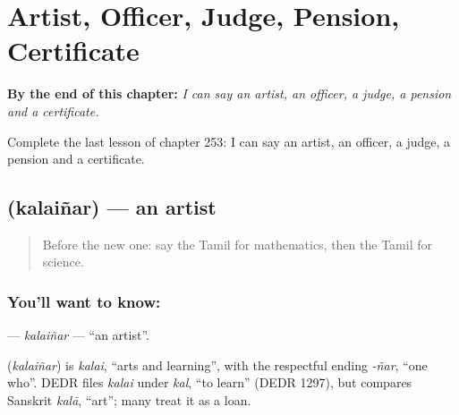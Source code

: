 
\chapter{Artist, Officer, Judge, Pension, Certificate}
\label{ch:ta-artist-officer-judge-pension-certificate}

\begin{chapteropening}
\textbf{By the end of this chapter:} \emph{I can say an artist, an officer, a judge, a pension and a certificate.}

Complete the last lesson of chapter 253: I can say an artist, an officer, a judge, a pension and a certificate.
\end{chapteropening}

\section[\texorpdfstring{\ta{கலைஞர்} (kalaiñar)}{கலைஞர் (kalaiñar)}]{ (kalaiñar) — an artist}

\label{lesson:TA-C253-kalainar}



\begin{quote}
Before the new one: say the Tamil for mathematics, then the Tamil for science.
\end{quote}

\subsection*{You'll want to know: }
\textbf{} — \emph{kalaiñar} — \textquotedblleft{}an artist\textquotedblright{}.

\begin{cousinweb}
\textbf{} (\emph{kalaiñar}) is \emph{kalai}, \textquotedblleft{}arts and learning\textquotedblright{}, with the respectful ending \emph{-ñar}, \textquotedblleft{}one who\textquotedblright{}. DEDR files \emph{kalai} under \emph{kal}, \textquotedblleft{}to learn\textquotedblright{} (DEDR 1297), but compares Sanskrit \emph{kalā}, \textquotedblleft{}art\textquotedblright{}; many treat it as a loan.
\end{cousinweb}

